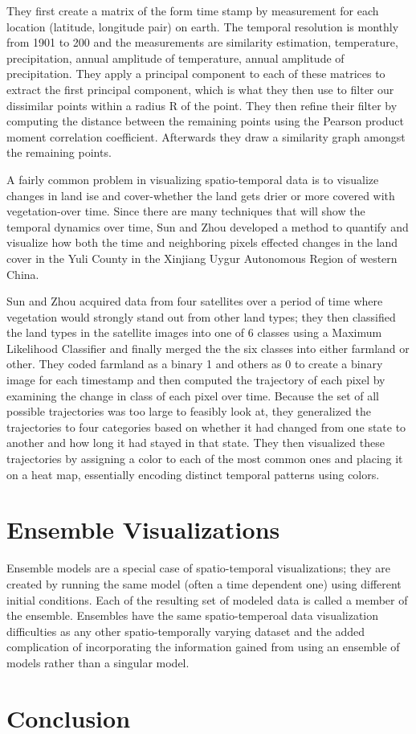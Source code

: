 \documentclass[letterpaper,onecolumn,titlepage]{Ythesis}
\begin{document}
They first create a matrix of the form time stamp by measurement for each location (latitude, longitude pair) on earth. The temporal resolution is monthly from 1901 to 200 and the measurements are similarity estimation, temperature, precipitation, annual amplitude of temperature, annual amplitude of precipitation. They apply a principal component to each of these matrices to extract the first principal component, which is what they then use to filter our dissimilar points within a radius R of the point. They then refine their filter by computing the distance between the remaining points using the Pearson product moment correlation coefficient. Afterwards they draw a similarity graph amongst the remaining points. 

A fairly common problem in visualizing spatio-temporal data is to visualize changes in land ise and cover-whether the land gets drier or more covered with vegetation-over time. Since there are many techniques that will show the temporal dynamics over time, Sun and Zhou \cite{SunZhou16} developed a method to quantify and visualize how both the time and neighboring pixels effected changes in the land cover in the Yuli County in the Xinjiang Uygur
Autonomous Region of western China. 

Sun and Zhou acquired data from four satellites over a period of time where vegetation would strongly stand out from other land types; they then classified the land types in the satellite images into one of 6 classes using a Maximum Likelihood Classifier and finally merged the the six classes into either farmland or other. They coded farmland as a binary 1 and others as 0 to create a binary image for each timestamp and then computed the trajectory of each pixel by examining the change in class of each pixel over time. Because the set of all possible trajectories was too large to feasibly look at, they generalized the trajectories to four categories based on whether it had changed from one state to another and how long it had stayed in that state. They then visualized these trajectories by assigning a color to each of the most common ones and placing it on a heat map, essentially encoding distinct temporal patterns using colors. 



\section{Ensemble Visualizations}
Ensemble models are a special case of spatio-temporal visualizations; they are created by running the same model (often a time dependent one) using different initial conditions. Each of the resulting set of modeled data is called a member of the ensemble. Ensembles have the same spatio-temperoal data visualization difficulties as any other spatio-temporally varying dataset and the added complication of incorporating the information gained from using an ensemble of models rather than a singular model. 





\section{Conclusion}
\label{sec:conclusion}


\pagebreak


\end{document}

